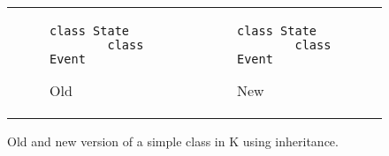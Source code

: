 \begin{figure}
  \centering
  \begin{tabular}[c]{ll}
    \begin{subfigure}[c]{0.4\textwidth}
      \begin{lstlisting}[mathescape]
        class State
        class Event

      \end{lstlisting}
      \caption{Old}
      \label{fig:old1}
    \end{subfigure}
    &
    \begin{subfigure}[c]{0.4\textwidth}
      \begin{lstlisting}[mathescape]
        class State
        class Event
      \end{lstlisting}
      \caption{New}
      \label{fig:new1}
    \end{subfigure}
    \\
  \end{tabular}    
  \caption{Old and new version of a simple class in K using inheritance.}
  \label{fig:example1}
\end{figure}

